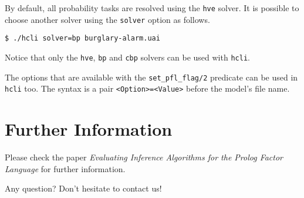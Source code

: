\documentclass{article}
\begin{document}
By default, all probability tasks are resolved using the \texttt{hve} solver. It is possible to choose another solver using the \texttt{solver} option as follows.

\texttt{\$ ./hcli solver=bp burglary-alarm.uai}

Notice that only the \texttt{hve}, \texttt{bp} and \texttt{cbp} solvers can be used with \texttt{hcli}.

The options that are available with the \texttt{set\_pfl\_flag/2} predicate can be used in \texttt{hcli} too. The syntax is a pair \texttt{<Option>=<Value>} before the model's file name.



\section{Further Information}
Please check the paper \textit{Evaluating Inference Algorithms for the Prolog Factor Language} for further information.

Any question? Don't hesitate to contact us!
\end{document}

